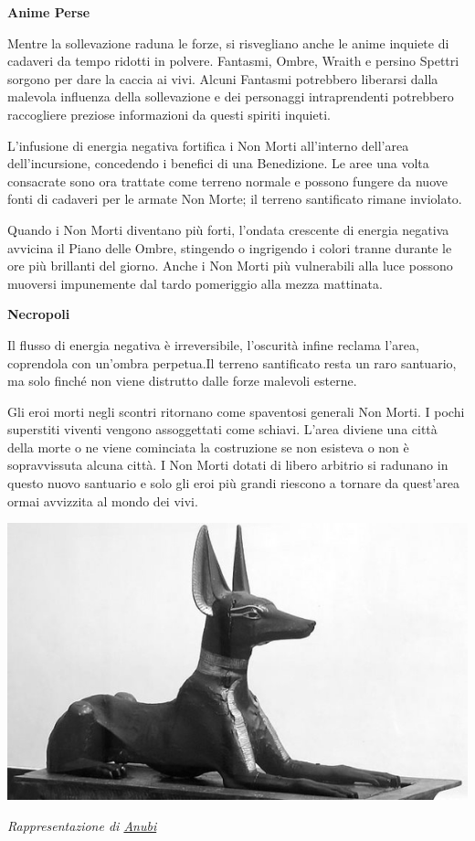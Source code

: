 \documentclass[a4paper,twoside,openany]{book}
\begin{document}
\begin{multicols}{2}
\textbf{Anime Perse}

Mentre la sollevazione raduna le forze, si risvegliano anche le anime inquiete di cadaveri da tempo ridotti in polvere. Fantasmi, Ombre, Wraith e persino Spettri sorgono per dare la caccia ai vivi. Alcuni Fantasmi potrebbero liberarsi dalla malevola influenza della sollevazione e dei personaggi intraprendenti potrebbero raccogliere preziose informazioni da questi spiriti inquieti.

L'infusione di energia negativa fortifica i Non Morti all'interno dell'area dell'incursione, concedendo i benefici di una Benedizione. Le aree una volta consacrate sono ora trattate come terreno normale e possono fungere da nuove fonti di cadaveri per le armate Non Morte; il terreno santificato rimane inviolato.

Quando i Non Morti diventano più forti, l'ondata crescente di energia negativa avvicina il Piano delle Ombre, stingendo o ingrigendo i colori tranne durante le ore più brillanti del giorno. Anche i Non Morti più vulnerabili alla luce possono muoversi impunemente dal tardo pomeriggio alla mezza mattinata.

\textbf{Necropoli}

Il flusso di energia negativa è irreversibile, l'oscurità infine reclama l'area, coprendola con un'ombra perpetua.Il terreno santificato resta un raro santuario, ma solo finché non viene distrutto dalle forze malevoli esterne.

Gli eroi morti negli scontri ritornano come spaventosi generali Non Morti. I pochi superstiti viventi vengono assoggettati come schiavi. L'area diviene una città della morte o ne viene cominciata la costruzione se non esisteva o non è sopravvissuta alcuna città. I Non Morti dotati di libero arbitrio si radunano in questo nuovo santuario e solo gli eroi più grandi riescono a tornare da quest'area ormai avvizzita al mondo dei vivi.

\end{multicols}

\vfill

\begin{center}
\includegraphics[width=0.45\linewidth]{immagini/anubis.png}

\emph{Rappresentazione di \href{https://it.wikipedia.org/wiki/Anubi}{Anubi}}
\end{center}
\end{document}
